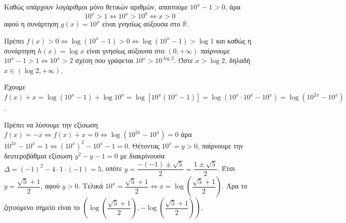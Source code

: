 \begin{alist}
\item Καθώς υπάρχουν λογάριθμοι μόνο θετικών αριθμών, απαιτούμε $10^x - 1 > 0$, άρα
\[10^x > 1 \Leftrightarrow 10^x > 10^0 \Leftrightarrow x > 0\]
αφού η συνάρτηση $g(x) = 10^x$ είναι γνησίως αύξουσα στο $\mathbb{R}$.
\item Πρέπει $f(x) > 0 \Leftrightarrow \log(10^x - 1) > 0 \Leftrightarrow \log(10^x - 1) > \log 1$ και καθώς η συνάρτηση $h(x) = \log x$ είναι γνησίως αύξουσα στο $(0, +\infty)$ παίρνουμε $10^x - 1 > 1 \Leftrightarrow 10^x > 2$ σχέση που γράφεται $10^x > 10^{\log 2}$. Ώστε $x > \log 2$, δηλαδή $x \in (\log 2, +\infty)$.
\item Έχουμε $f(x) + x = \log(10^x - 1) + \log 10^x = \log[10^x(10^x - 1)] = \log(10^x \cdot 10^x - 10^x) = \log(10^{2x} - 10^x)$.
\item Πρέπει να λύσουμε την εξίσωση $f(x) = -x \Leftrightarrow f(x) + x = 0 \Leftrightarrow \log(10^{2x} - 10^x) = 0$ άρα $10^{2x} - 10^x = 1 \Leftrightarrow (10^x)^2 - 10^x - 1 = 0$. Θέτοντας $10^x = y > 0$, παίρνουμε την δευτεροβάθμια εξίσωση $y^2 - y - 1 = 0$ με διακρίνουσα $\Delta = (-1)^2 - 4 \cdot 1 \cdot (-1) = 5$, οπότε $y = \dfrac{-(-1) \pm \sqrt{5}}{2} = \dfrac{1 \pm \sqrt{5}}{2}$. Έτσι $y = \dfrac{\sqrt{5} + 1}{2}$, αφού $y > 0$.
Τελικά $10^x = \dfrac{\sqrt{5} + 1}{2} \Leftrightarrow x = \log\left(\dfrac{\sqrt{5} + 1}{2}\right)$.
Άρα το ζητούμενο σημείο είναι το $\left(\log\left(\dfrac{\sqrt{5} + 1}{2}\right), -\log\left(\dfrac{\sqrt{5} + 1}{2}\right)\right)$.
\end{alist}

